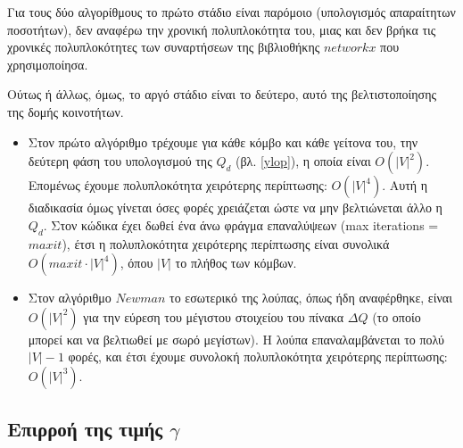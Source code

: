 \documentclass[10pt, letterpaper]{article}
\begin{document}
Για τους δύο αλγορίθμους το πρώτο στάδιο είναι παρόμοιο (υπολογισμός απαραίτητων ποσοτήτων), δεν αναφέρω την χρονική πολυπλοκότητα
του, μιας και δεν βρήκα τις χρονικές πολυπλοκότητες των συναρτήσεων της βιβλιοθήκης
$networkx$ που χρησιμοποίησα.

Ούτως ή άλλως, όμως, το αργό στάδιο είναι το δεύτερο, αυτό της βελτιστοποίησης της 
δομής κοινοτήτων. 

\begin{itemize}
  \item Στον πρώτο αλγόριθμο τρέχουμε για κάθε κόμβο και κάθε γείτονα του, την δεύτερη
  φάση του υπολογισμού της $Q_d$ (βλ. \ref{ylop}), η οποία είναι $O(|V|^2)$. 
  Επομένως έχουμε πολυπλοκότητα χειρότερης περίπτωσης: $O(|V|^4)$. 
  Αυτή η διαδικασία όμως γίνεται όσες φορές χρειάζεται ώστε να μην βελτιώνεται άλλο 
  η $Q_d$. Στον κώδικα έχει δωθεί ένα άνω φράγμα επαναλύψεων (\textlatin{max iterations} = $maxit$),
  έτσι η πολυπλοκότητα χειρότερης περίπτωσης είναι συνολικά $O(maxit \cdot |V|^4)$,
  όπου $|V|$ το πλήθος των κόμβων.


  \item Στον αλγόριθμο $Newman$ το εσωτερικό της λούπας, όπως ήδη αναφέρθηκε, είναι 
  $O(|V|^2)$ για την εύρεση του μέγιστου στοιχείου του πίνακα $\Delta Q$ (το οποίο μπορεί 
  και να βελτιωθεί με σωρό μεγίστων). Η λούπα επαναλαμβάνεται το πολύ $|V|-1$
  φορές, και έτσι έχουμε συνολοκή πολυπλοκότητα χειρότερης περίπτωσης: $O(|V|^3)$.


\end{itemize}





\subsection{Επιρροή της τιμής $\gamma$}  \label{gamma}
\end{document}

